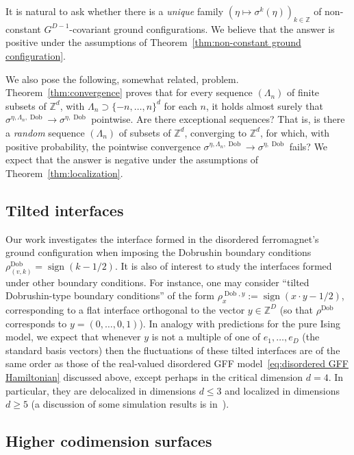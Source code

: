 \documentclass[11pt, reqno]{amsart}
\newcommand{\Z}{\mathbb{Z}}
\DeclareMathOperator{\sign}{sign}
\DeclareMathOperator{\Dob}{Dob}
\numberwithin{equation}{section}
\begin{document}
It is natural to ask whether there is a \emph{unique} family $(\eta\mapsto\sigma^k(\eta))_{k\in\Z}$ of non-constant $G^{D-1}$-covariant ground configurations. We believe that the answer is positive under the assumptions of Theorem~\ref{thm:non-constant ground configuration}.

We also pose the following, somewhat related, problem. Theorem~\ref{thm:convergence} proves that for every sequence $(\Lambda_n)$ of finite subsets of $\Z^d$, with $\Lambda_n\supset\{-n,\ldots, n\}^d$ for each $n$, it holds almost surely that $\sigma^{\eta,\Lambda_n,\Dob}\to\sigma^{\eta,\Dob}$ pointwise. Are there exceptional sequences? That is, is there a \emph{random} sequence $(\Lambda_n)$ of subsets of $\Z^d$, converging to $\Z^d$, for which, with positive probability, the pointwise convergence $\sigma^{\eta,\Lambda_n,\Dob}\to\sigma^{\eta,\Dob}$ fails? We expect that the answer is negative under the assumptions of Theorem~\ref{thm:localization}.

\subsection{Tilted interfaces} Our work investigates the interface formed in the disordered ferromagnet's ground configuration when imposing the Dobrushin boundary conditions $\rho^{\Dob}_{(v,k)} = \sign(k - 1/2)$. It is also of interest to study the interfaces formed under other boundary conditions. For instance, one may consider ``tilted Dobrushin-type boundary conditions'' of the form $\rho^{\Dob, y}_x:=\sign(x\cdot y - 1/2)$, corresponding to a flat interface orthogonal to the vector $y\in\Z^D$ (so that $\rho^{\Dob}$ corresponds to $y=(0,\ldots,0,1)$). In analogy with predictions for the pure Ising model, we expect that whenever $y$ is not a multiple of one of $e_1,\ldots, e_D$ (the standard basis vectors) then the fluctuations of these tilted interfaces are of the same order as those of the real-valued disordered GFF model~\eqref{eq:disordered GFF Hamiltonian} discussed above, except perhaps in the critical dimension $d=4$. In particular, they are delocalized in dimensions $d\le 3$ and localized in dimensions $d\ge 5$ (a discussion of some simulation results is in~\cite[Section 7.2.3]{ADMR01}).

\subsection{Higher codimension surfaces}\label{sec:higher codimension surfaces}
\end{document}
